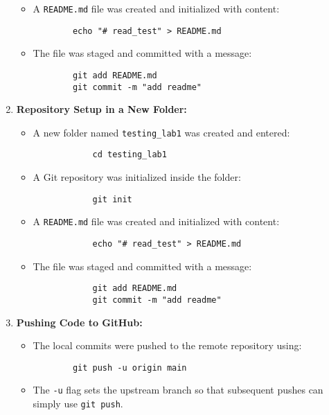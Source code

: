 \documentclass[12pt, a4paper]{report}
\begin{document}
\begin{enumerate}
\begin{itemize}
        \item A \texttt{README.md} file was created and initialized with content:
        \begin{verbatim}
        echo "# read_test" > README.md
        \end{verbatim}

        \item The file was staged and committed with a message:
        \begin{verbatim}
        git add README.md
        git commit -m "add readme"
        \end{verbatim}
    \end{itemize}

    \item \textbf{Repository Setup in a New Folder:}
        \begin{itemize}
            \item A new folder named \texttt{testing\_lab1} was created and entered:
            \begin{verbatim}
            cd testing_lab1
            \end{verbatim}

            \item A Git repository was initialized inside the folder:
            \begin{verbatim}
            git init
            \end{verbatim}

            \item A \texttt{README.md} file was created and initialized with content:
            \begin{verbatim}
            echo "# read_test" > README.md
            \end{verbatim}

            \item The file was staged and committed with a message:
            \begin{verbatim}
            git add README.md
            git commit -m "add readme"
            \end{verbatim}
        \end{itemize}


    \item \textbf{Pushing Code to GitHub:}
    \begin{itemize}
        \item The local commits were pushed to the remote repository using:
        \begin{verbatim}
        git push -u origin main
        \end{verbatim}
        \item The \texttt{-u} flag sets the upstream branch so that subsequent pushes can simply use \texttt{git push}.
    \end{itemize}


\end{enumerate}
\end{document}
